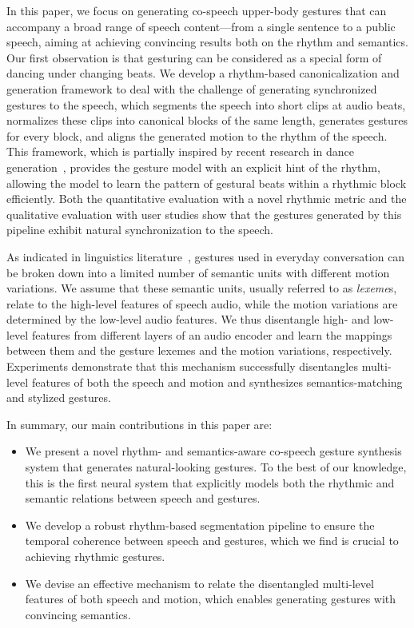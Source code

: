 In this paper, we focus on generating co-speech upper-body gestures that can accompany a broad range of speech content---from a single sentence to a public speech, aiming at achieving convincing results both on the rhythm and semantics. Our first observation is that gesturing can be considered as a special form of dancing under changing beats. We develop a rhythm-based canonicalization and generation framework to deal with the challenge of generating synchronized gestures to the speech, which segments the speech into short clips at audio beats, normalizes these clips into canonical blocks of the same length, generates gestures for every block, and aligns the generated motion to the rhythm of the speech. This framework, which is partially inspired by recent research in dance generation~\cite{aristidou2021rhythm}, provides the gesture model with an explicit hint of the rhythm, allowing the model to learn the pattern of gestural beats within a rhythmic block efficiently. Both the quantitative evaluation with a novel rhythmic metric and the qualitative evaluation with user studies show that the gestures generated by this pipeline exhibit natural synchronization to the speech.

As indicated in linguistics literature~\cite{Kipp2004_Gesture,Neff2008Gesture,Webb1996_Linguistic}, gestures used in everyday conversation can be broken down into a limited number of semantic units with different motion variations. We assume that these semantic units, usually referred to as \emph{lexeme}s, relate to the high-level features of speech audio, while the motion variations are determined by the low-level audio features. We thus disentangle high- and low-level features from different layers of an audio encoder and learn the mappings between them and the gesture lexemes and the motion variations, respectively. Experiments demonstrate that this mechanism successfully disentangles multi-level features of both the speech and motion and synthesizes semantics-matching and stylized gestures.

In summary, our main contributions in this paper are:
\begin{itemize}
    \item We present a novel rhythm- and semantics-aware co-speech gesture synthesis system that generates natural-looking gestures. To the best of our knowledge, this is the first neural system that explicitly models both the rhythmic and semantic relations between speech and gestures.
    \item We develop a robust rhythm-based segmentation pipeline to ensure the temporal coherence between speech and gestures, which we find is crucial to achieving rhythmic gestures.
    \item We devise an effective mechanism to relate the disentangled multi-level features of both speech and motion, which enables generating gestures with convincing semantics.
\end{itemize}
